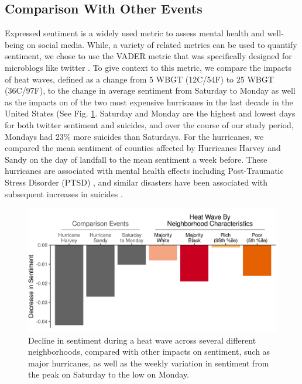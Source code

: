 \documentclass{article}
\begin{document}
\subsection{Comparison With Other Events}

Expressed sentiment is a widely used metric to assess mental health and well-being on social media.  While, a variety of related metrics can be used to quantify sentiment, we chose to use the VADER metric that was specifically designed for microblogs like twitter \cite{hutto2014vader}.  To give context to this metric, we compare the impacts of heat waves, defined as a change from 5 WBGT (12C/54F) to 25 WBGT (36C/97F), to the change in average sentiment from Saturday to Monday as well as the impacts on of the two most expensive hurricanes in the last decade in the United States (See Fig. \ref{fig:compare}.  Saturday and Monday are the highest and lowest days for both twitter sentiment and suicides, and over the course of our study period, Mondays had 23\% more suicides than Saturdays.  For the hurricanes, we compared the mean sentiment of counties affected by Hurricanes Harvey and Sandy on the day of landfall to the mean sentiment a week before.  These hurricanes are associated with mental health effects including Post-Traumatic Stress Disorder (PTSD) \cite{Schwartz2017Aug, Schwartz2018May}, and similar disasters have been associated with subsequent increases in suicides \cite{Krug1998Feb}.

\begin{figure}[H]
  \centering
  \includegraphics[width=\linewidth]{../res/comparison_plot.png}
  \caption{Decline in sentiment during a heat wave across several different neighborhoods, compared with other impacts on sentiment, such as major hurricanes, as well as the weekly variation in sentiment from the peak on Saturday to the low on Monday.}
  \label{fig:compare}
\end{figure}
\end{document}
